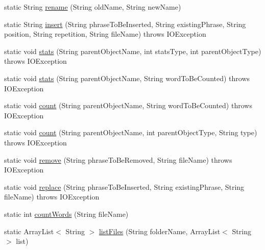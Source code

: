 \begin{DoxyCompactItemize}
\item 
static String \hyperlink{classcom_1_1poly_1_1nlp_1_1filekommander_1_1file_1_1actions_1_1_file_action_utils_a195173915a702daa3da1750b7a00bf8f}{rename} (String old\-Name, String new\-Name)
\item 
static String \hyperlink{classcom_1_1poly_1_1nlp_1_1filekommander_1_1file_1_1actions_1_1_file_action_utils_a0f8ca9726628c7fa3b4e191d9c688cba}{insert} (String phrase\-To\-Be\-Inserted, String existing\-Phrase, String position, String repetition, String file\-Name)  throws I\-O\-Exception 
\item 
static void \hyperlink{classcom_1_1poly_1_1nlp_1_1filekommander_1_1file_1_1actions_1_1_file_action_utils_ad8d655de0cba854b1c409ed450bbe636}{stats} (String parent\-Object\-Name, int stats\-Type, int parent\-Object\-Type)  throws I\-O\-Exception 
\item 
static void \hyperlink{classcom_1_1poly_1_1nlp_1_1filekommander_1_1file_1_1actions_1_1_file_action_utils_a8ff2b8a44ef71bfb04fb320da780e4eb}{stats} (String parent\-Object\-Name, String word\-To\-Be\-Counted)  throws I\-O\-Exception 
\item 
static void \hyperlink{classcom_1_1poly_1_1nlp_1_1filekommander_1_1file_1_1actions_1_1_file_action_utils_a2df1aca8a703f77ff7ca700541d6fb6b}{count} (String parent\-Object\-Name, String word\-To\-Be\-Counted)  throws I\-O\-Exception 
\item 
static void \hyperlink{classcom_1_1poly_1_1nlp_1_1filekommander_1_1file_1_1actions_1_1_file_action_utils_abda56bf0db7967ce2a92b8be5503150a}{count} (String parent\-Object\-Name, int parent\-Object\-Type, String type)  throws I\-O\-Exception 
\item 
static void \hyperlink{classcom_1_1poly_1_1nlp_1_1filekommander_1_1file_1_1actions_1_1_file_action_utils_ac7e7850c45017865b67e5ad1280d1970}{remove} (String phrase\-To\-Be\-Removed, String file\-Name)  throws I\-O\-Exception 
\item 
static void \hyperlink{classcom_1_1poly_1_1nlp_1_1filekommander_1_1file_1_1actions_1_1_file_action_utils_a07c59ff019da6971e505960a04da604d}{replace} (String phrase\-To\-Be\-Inserted, String existing\-Phrase, String file\-Name)  throws I\-O\-Exception 
\item 
static int \hyperlink{classcom_1_1poly_1_1nlp_1_1filekommander_1_1file_1_1actions_1_1_file_action_utils_aa776213b3cb78ddde6f89e4b982a8e18}{count\-Words} (String file\-Name)
\item 
static Array\-List$<$ String $>$ \hyperlink{classcom_1_1poly_1_1nlp_1_1filekommander_1_1file_1_1actions_1_1_file_action_utils_a1780994dac039e63b9b2c8971259d044}{list\-Files} (String folder\-Name, Array\-List$<$ String $>$ list)

\end{DoxyCompactItemize}
